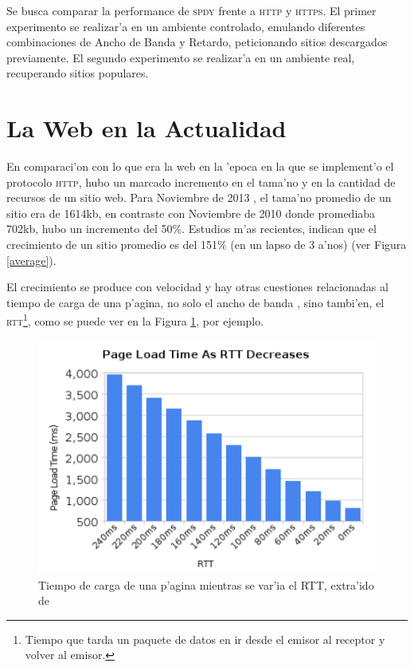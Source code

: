 \documentclass[a4paper,11pt,twocolumn]{article}
\begin{document}
Se busca comparar la performance de \textsc{spdy} frente a \textsc{http} y \textsc{https}. El primer experimento se realizar'a en un ambiente controlado, emulando diferentes combinaciones de Ancho de Banda y Retardo, peticionando sitios descargados previamente. El segundo experimento se realizar'a en un ambiente real, recuperando sitios populares.

\section{La Web en la Actualidad}

En comparaci'on con lo que era la web en la 'epoca en la que se implement'o el protocolo \textsc{http}, hubo un marcado incremento en el tama'no y en la cantidad de recursos de un sitio web. Para Noviembre de 2013 \cite{httpArchive}, el tama'no promedio de un sitio era de 1614kb, en contraste con Noviembre de 2010 donde promediaba 702kb, hubo un incremento del 50\%. Estudios m'as recientes, indican que el crecimiento de un sitio promedio es del 151\% (en un lapso de 3 a'nos) \cite{tammy} (ver Figura \ref{average}).

El crecimiento se produce con velocidad \cite{averageWebPage} y hay otras cuestiones relacionadas al tiempo de carga de una p'agina, no solo el ancho de banda \cite{moreBand}, sino tambi'en, el \textsc{rtt}\footnote{Tiempo que tarda un paquete de datos en ir desde el emisor al receptor y volver al emisor.}, como se puede ver en la Figura \ref{rttBelsche}, por ejemplo.

\begin{figure}[h!]
  	\centering
	\includegraphics[scale=0.5]{belsche}
	\caption{\small Tiempo de carga de una p'agina mientras se var'ia el RTT, extra'ido de \cite{moreBand}}
	\label{rttBelsche}
\end{figure}
\end{document}
